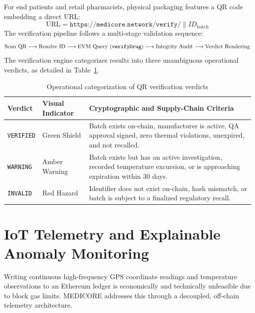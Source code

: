 \documentclass[pdflatex,sn-mathphys-num]{sn-jnl}
\theoremstyle{thmstyleone}
\theoremstyle{thmstyletwo}
\theoremstyle{thmstylethree}
\begin{document}
For end patients and retail pharmacists, physical packaging features a QR code embedding a direct URL:
\begin{equation}
\text{URL} = \texttt{https://medicore.network/verify/} \parallel ID_{\text{batch}}
\end{equation}
The verification pipeline follows a multi-stage validation sequence:
\begin{equation}
\text{Scan QR} \longrightarrow \text{Resolve ID} \longrightarrow \text{EVM Query (\texttt{verifyDrug})} \longrightarrow \text{Integrity Audit} \longrightarrow \text{Verdict Rendering}
\end{equation}
The verification engine categorizes results into three unambiguous operational verdicts, as detailed in Table~\ref{tab:qr-verdicts}.

\begin{table}[htbp]
\centering
\caption{Operational categorization of QR verification verdicts}
\label{tab:qr-verdicts}
\vspace{0.5em}
\begin{tabularx}{\textwidth}{llX}
\toprule
\textbf{Verdict} & \textbf{Visual Indicator} & \textbf{Cryptographic and Supply-Chain Criteria} \\
\midrule
\texttt{VERIFIED} & Green Shield & Batch exists on-chain, manufacturer is active, QA approval signed, zero thermal violations, unexpired, and not recalled. \\
\texttt{WARNING} & Amber Warning & Batch exists but has an active investigation, recorded temperature excursion, or is approaching expiration within 30 days. \\
\texttt{INVALID} & Red Hazard & Identifier does not exist on-chain, hash mismatch, or batch is subject to a finalized regulatory recall. \\
\bottomrule
\end{tabularx}
\end{table}


\section{IoT Telemetry and Explainable Anomaly Monitoring}\label{sec:telemetry}

Writing continuous high-frequency GPS coordinate readings and temperature observations to an Ethereum ledger is economically and technically unfeasible due to block gas limits. MEDICORE addresses this through a decoupled, off-chain telemetry architecture.
\end{document}

